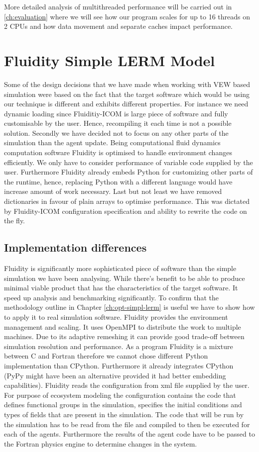 \documentclass[12pt, a4paper]{report}
\begin{document}
More detailed analysis of multithreaded performance will be carried out in
\ref{ch:evaluation} where we will see how our program scales for up to 16
threads on 2 CPUs and how data movement and separate caches impact performance.

\chapter{Fluidity Simple LERM Model}\label{ch:thread-fluid}
Some of the design decisions that we have made when working with VEW based
simulation were based on the fact that the target software which would
be using our technique is different and exhibits different properties.
For instance we need dynamic loading since Fluiditiy-ICOM is large
piece of software and fully customisable by the user. Hence, recompiling
it each time is not a possible solution. Secondly we have decided
not to focus on any other parts of the simulation than the agent update.
Being computational fluid dynamics computation software Fluidity is
optimised to handle environment changes efficiently. We only have to consider
performance of variable code supplied by the user. Furthermore Fluidity
already embeds Python for customizing other parts of the runtime, hence,
replacing Python with a different language would have increase amount
of work necessary. Last but not least we have removed dictionaries in favour
of plain arrays to optimise performance. This was dictated by Fluidity-ICOM
configuration specification and ability to rewrite the code on the fly.

\section{Implementation differences}\label{sec:impl-diff}
Fluidity is significantly more sophisticated piece of software than the simple
simulation we have been analysing. While there's benefit to be able to
produce minimal viable product that has the characteristics of the target
software. It speed up analysis and benchmarking significantly. To confirm
that the methodology outline in Chapter \ref{ch:opt-simpl-lerm} is useful we have to
show how to apply it to real simulation software. Fluidity provides the
environment management and scaling. It uses OpenMPI to distribute the
work to multiple machines. Due to its adaptive remeshing it can provide
good trade-off between simulation resolution and performance. As a program
Fluidity is a mixture between C and Fortran therefore we cannot chose
different Python implementation than CPython. Furthermore it already
integrates CPython (PyPy might have been an alternative provided it
had better embedding capabilities). Fluidity reads the configuration from
xml file supplied by the user. For purpose of ecosystem modeling the
configuration contains the code that defines functional groups in the
simulation, specifies the initial conditions and types of fields that are
present in the simulation. The code that will be run by the simulation has
to be read from the file and compiled to then be executed for each of the agents.
Furthermore the results of the agent code have to be passed to the Fortran
physics engine to determine changes in the system.
\end{document}
